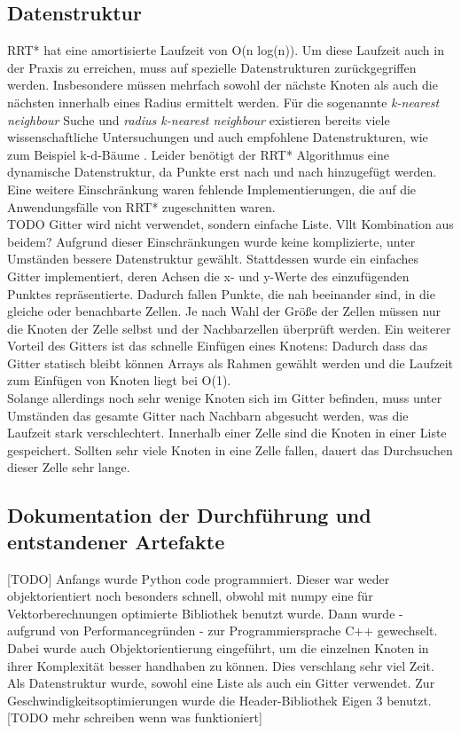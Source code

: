 \subsection{Datenstruktur}
RRT* hat eine amortisierte Laufzeit von O(n log(n)). Um diese Laufzeit auch in der Praxis zu erreichen, muss auf spezielle Datenstrukturen zurückgegriffen werden. Insbesondere müssen mehrfach sowohl der nächste Knoten als auch die nächsten innerhalb eines Radius ermittelt werden. Für die sogenannte \textit{k-nearest neighbour} Suche und \textit{radius k-nearest neighbour} existieren bereits viele wissenschaftliche Untersuchungen und auch empfohlene Datenstrukturen, wie zum Beispiel k-d-Bäume \citep{Bentley75}. Leider benötigt der RRT* Algorithmus eine dynamische Datenstruktur, da Punkte erst nach und nach hinzugefügt werden. Eine weitere Einschränkung waren fehlende Implementierungen, die auf die Anwendungsfälle von RRT* zugeschnitten waren. \\
TODO Gitter wird nicht verwendet, sondern einfache Liste. Vllt Kombination aus beidem?
Aufgrund dieser Einschränkungen wurde keine komplizierte, unter Umständen bessere Datenstruktur gewählt. Stattdessen wurde ein einfaches Gitter implementiert, deren Achsen die x- und y-Werte des einzufügenden Punktes repräsentierte. Dadurch fallen Punkte, die nah beeinander sind, in die gleiche oder benachbarte Zellen. Je nach Wahl der Größe der Zellen müssen nur die Knoten der Zelle selbst und der Nachbarzellen überprüft werden. Ein weiterer Vorteil des Gitters ist das schnelle Einfügen eines Knotens: Dadurch dass das Gitter statisch bleibt können Arrays als Rahmen gewählt werden und die Laufzeit zum Einfügen von Knoten liegt bei O(1).\\
Solange allerdings noch sehr wenige Knoten sich im Gitter befinden, muss unter Umständen das gesamte Gitter nach Nachbarn abgesucht werden, was die Laufzeit stark verschlechtert. Innerhalb einer Zelle sind die Knoten in einer Liste gespeichert. Sollten sehr viele Knoten in eine Zelle fallen, dauert das Durchsuchen dieser Zelle sehr lange.


\subsection{Dokumentation der Durchführung und entstandener Artefakte}
[TODO] 
Anfangs wurde Python code programmiert. Dieser war weder objektorientiert noch besonders schnell, obwohl mit numpy eine für Vektorberechnungen optimierte Bibliothek benutzt wurde. Dann wurde - aufgrund von Performancegründen - zur Programmiersprache C++ gewechselt. Dabei wurde auch Objektorientierung eingeführt, um die einzelnen Knoten in ihrer Komplexität besser handhaben zu können. Dies verschlang sehr viel Zeit.\\
Als Datenstruktur wurde, sowohl eine Liste als auch ein Gitter verwendet. Zur Geschwindigkeitsoptimierungen wurde die Header-Bibliothek Eigen 3 benutzt. [TODO mehr schreiben wenn was funktioniert]
